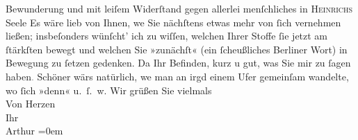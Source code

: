 \begin{ledgroupsized}[t]{13cm}
               Bewunderung und mit  leiſem Widerſtand gegen
               allerlei menſchliches in \textsc{Heinrichs} Seele\pend
           \pstart
           {\pb}Es wäre lieb von Ihnen, we{\geminationn} Sie nächſtens etwas mehr von ſich vernehmen ließen;
               insbeſonders wünſcht’ ich zu wiſſen, welchen Ihrer Stoffe ſie jetzt am ſtärkſten
               bewegt und welchen Sie »zunächſt« (ein ſcheußliches Berliner Wort) in Bewegung zu ſetzen gedenken. Da{\geminationn} Ihr Befinden, kurz u gut, was Sie mir \introOben{}zu\introOben{} ſagen haben\textcolor{gray}{.} Schöner wärs natürlich,
                  we{\geminationn}{ }{\pb}man an irgd einem Ufer gemeinſam wandelte,
               wo ſich »denn« u. ſ. w.\pend
           \pstart
           Wir grüßen Sie vielmals
               {\\[\baselineskip]}Von Herzen {\\[\baselineskip]}Ihr {\\[\baselineskip]}\spacefill\mbox{Arthur}\pend
           \leftskip=0em{}
         
         \endnumbering{}\end{ledgroupsized}  \newcommand{\dateiname}{L03009}\newcommand{\titel}{Arthur Schnitzler an Felix Salten, 5. 8. 1907}\newcommand{\editorInnen}{Martin Anton Müller und Laura Untner}
      